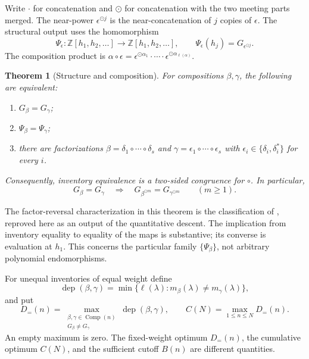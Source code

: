 \documentclass[11pt,a4paper]{amsart}
\numberwithin{equation}{section}
\theoremstyle{plain}
\newtheorem{theorem}{Theorem}[section]
\theoremstyle{definition}
\newcommand{\Z}{\mathbb Z}
\newcommand{\Comp}{\operatorname{Comp}}
\newcommand{\dep}{\operatorname{dep}}
\begin{document}
Write \(\cdot\) for concatenation and \(\odot\) for concatenation with
the two meeting parts merged.  The near-power \(\epsilon^{\odot j}\)
is the near-concatenation of \(j\) copies of \(\epsilon\).
The structural output uses the homomorphism
\begin{equation}\label{eq:introPsi}
\Psi_\epsilon:\Z[h_1,h_2,\ldots]\longrightarrow\Z[h_1,h_2,\ldots],
\qquad \Psi_\epsilon(h_j)=G_{\epsilon^{\odot j}}.
\end{equation}
The composition product is
\(\alpha\circ\epsilon=\epsilon^{\odot\alpha_1}\cdot\cdots\cdot
\epsilon^{\odot\alpha_{\ell(\alpha)}}\).

\begin{theorem}[Structure and composition]\label{thm:main-structure}
For compositions \(\beta,\gamma\), the following are equivalent:
\begin{enumerate}
\item \(G_\beta=G_\gamma\);
\item \(\Psi_\beta=\Psi_\gamma\);
\item there are factorizations
\(\beta=\delta_1\circ\cdots\circ\delta_s\) and
\(\gamma=\epsilon_1\circ\cdots\circ\epsilon_s\) with
\(\epsilon_i\in\{\delta_i,\delta_i^*\}\) for every \(i\).
\end{enumerate}
Consequently, inventory equivalence is a two-sided congruence for \(\circ\).
In particular,
\begin{equation}\label{eq:REV}
G_\beta=G_\gamma\quad\Longrightarrow\quad
G_{\beta^{\odot m}}=G_{\gamma^{\odot m}}
\qquad(m\ge1).
\end{equation}
\end{theorem}

The factor-reversal characterization in this theorem is the classification
of \cite{Billera2006DecomposableCompositions}, reproved here as an output of the quantitative descent.
The implication from inventory equality to equality of the maps is
substantive; its converse is evaluation at \(h_1\).  This concerns the
particular family \(\{\Psi_\beta\}\), not arbitrary polynomial
endomorphisms.

For unequal inventories of equal weight define
\[
\dep(\beta,\gamma)=\min\{\ell(\lambda):m_\beta(\lambda)\ne m_\gamma(\lambda)\},
\]
and put
\begin{equation}\label{eq:depth-defs}
D_{=}(n)=\max_{\substack{\beta,\gamma\in\Comp(n)\\G_\beta\ne G_\gamma}}
\dep(\beta,\gamma),\qquad
C(N)=\max_{1\le n\le N}D_{=}(n).
\end{equation}
An empty maximum is zero.  The fixed-weight optimum \(D_{=}(n)\), the
cumulative optimum \(C(N)\), and the sufficient cutoff \(B(n)\)
are different quantities.
\end{document}
